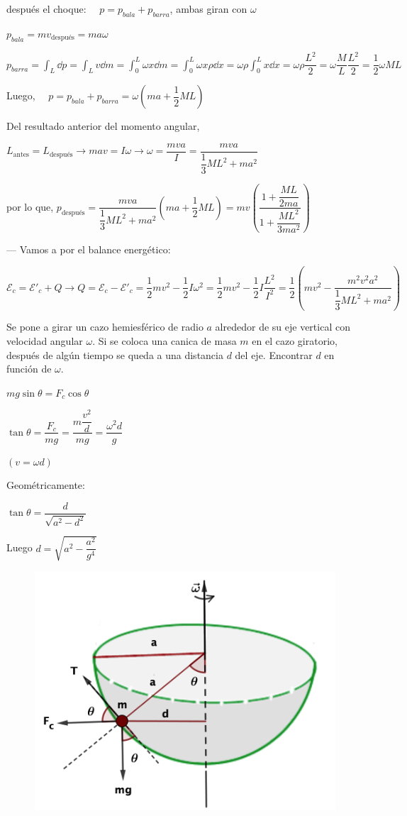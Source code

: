 después el choque: $\quad p=p_{bala}+p_{barra}$, ambas giran con $\omega$

$p_{bala}=mv_{\text{después}}=m a\omega$

$p_{barra}=\displaystyle \int_L \dd p=\int_L v\dd m=\int_0^L \omega x \dd m =\int_0^L \omega x \rho \dd x=  \omega \rho \int_0^L x \dd x= \omega \rho \dfrac {L^2}{2}=\omega \dfrac {M}{L} \dfrac{L^2}{2}=\dfrac 1 2 \omega M L$

Luego, $\quad p=p_{bala}+p_{barra}=\omega \left( ma + \dfrac 1 2 ML \right)$

Del resultado anterior del momento angular,

 $L_{\text{antes}}=L_{\text{después}} \to mav=I\omega \to \omega=\dfrac{mva}{I}=\dfrac{mva}{\dfrac 1 3 ML^2+ma^2} $

por lo que, $p_{\text{después}}=\dfrac{mva}{\dfrac 1 3 ML^2+ma^2}\left( ma + \dfrac 1 2 ML \right) = mv\left( \dfrac{1+\dfrac{ML}{2ma}}{1+\dfrac{ML^2}{3ma^2}} \right)$

--- Vamos a por el balance energético: 

$\mathcal E_c=\mathcal E'_c+Q \to Q=\mathcal E_c-\mathcal E'_c=\dfrac 1 2 m v^2 - \dfrac 1 2 I \omega^2 = \dfrac 1 2 m v^2 - \dfrac 1 2 I \dfrac{L^2}{I^2}= \dfrac 1 2 \left( mv^2 - \dfrac{m^2v^2a^2}{\dfrac 1 3 ML^2+ma^2} \right)$

\begin{prob}
Se pone a girar un cazo hemiesférico de radio $a$ alrededor de su eje vertical con velocidad angular $\omega$. Si se coloca una canica de masa $m$ en el cazo giratorio, después de algún tiempo se queda a una distancia $d$ del eje. Encontrar $d$ en función de $\omega$.	
\end{prob}
\begin{multicols}{2}
$mg\sin \theta=F_c \cos \theta$

$\tan \theta=\dfrac{F_c}{mg}=\dfrac{m\dfrac{v^2}{d}}{mg}=\dfrac{\omega^2 d}{g}$

\textcolor{gris}{$(v=\omega d)$}

Geométricamente: 

$\tan \theta=\dfrac{d}{\sqrt{a^2-d^2}}$

Luego $d=\sqrt{a^2-\dfrac{a^2}{g^4}}$
\begin{figure}[H]
	\centering
	\includegraphics[width=.55\textwidth]{imagenes/imagenes17/T17IM10.png}
	\end{figure}
\end{multicols}

